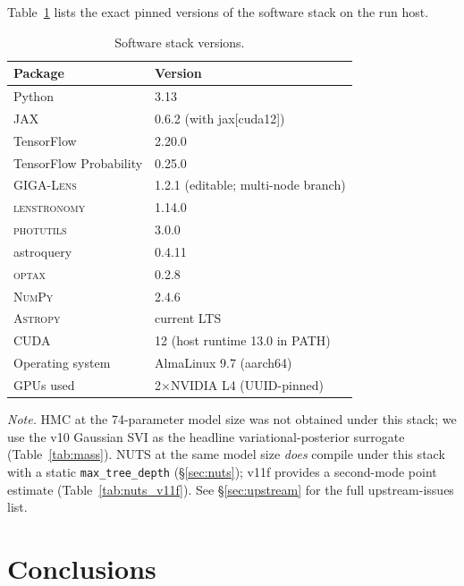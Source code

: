 \documentclass[11pt,letterpaper]{article}
\newcommand{\gigalens}{\textsc{GIGA-Lens}}
\newcommand{\lenstronomy}{\textsc{lenstronomy}}
\newcommand{\photutils}{\textsc{photutils}}
\begin{document}
Table~\ref{tab:software} lists the exact pinned versions of the
software stack on the run host.

\begin{table}[ht]
\centering
\caption{Software stack versions.}
\label{tab:software}
\begin{tabular}{ll}
\toprule
Package & Version \\
\midrule
Python                          & 3.13 \\
JAX                             & 0.6.2 (with jax[cuda12]) \\
TensorFlow                      & 2.20.0 \\
TensorFlow Probability          & 0.25.0 \\
\gigalens                       & 1.2.1 (editable; multi-node branch) \\
\lenstronomy                    & 1.14.0 \\
\photutils                      & 3.0.0 \\
astroquery                      & 0.4.11 \\
\textsc{optax}                  & 0.2.8 \\
\textsc{NumPy}                  & 2.4.6 \\
\textsc{Astropy}                & current LTS \\
CUDA                            & 12 (host runtime 13.0 in PATH) \\
Operating system                & AlmaLinux 9.7 (aarch64) \\
GPUs used                       & 2$\times$NVIDIA L4 (UUID-pinned) \\
\bottomrule
\end{tabular}
\par\smallskip
{\footnotesize\textit{Note.} HMC at the 74-parameter model size was not
obtained under this stack; we use the v10 Gaussian SVI as the headline
variational-posterior surrogate (Table~\ref{tab:mass}). NUTS at the
same model size \textit{does} compile under this stack with a static
\texttt{max\_tree\_depth} (\S\ref{sec:nuts}); v11f provides a
second-mode point estimate (Table~\ref{tab:nuts_v11f}). See
\S\ref{sec:upstream} for the full upstream-issues list.}
\end{table}

\section{Conclusions}
\label{sec:conclusions}
\end{document}
